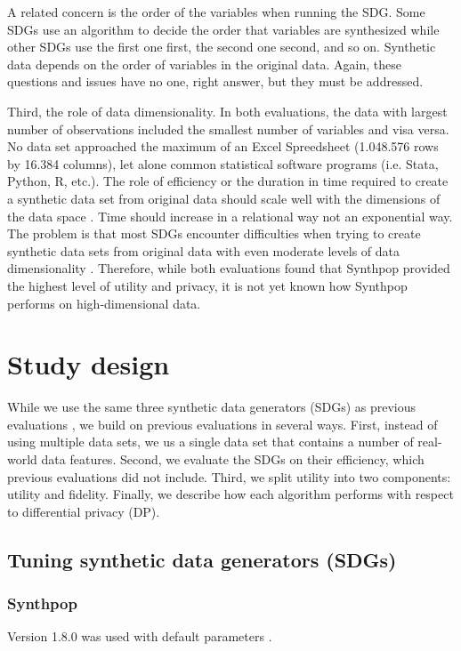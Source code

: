 \documentclass[runningheads]{llncs}
\begin{document}
A related concern is the order of the variables when running the SDG.  Some SDGs use an algorithm to decide the order that variables are synthesized while other SDGs use the first one first, the second one second, and so on.  Synthetic data depends on the order of variables in the original data.  Again, these questions and issues have no one, right answer, but they must be addressed.

Third, the role of data dimensionality.  In both evaluations, the data with largest number of observations included the smallest number of variables and visa versa.  No data set approached the maximum of an Excel Spreedsheet (1.048.576 rows by 16.384 columns), let alone common statistical software programs (i.e. Stata, Python, R, etc.).  The role of efficiency or the duration in time required to create a synthetic data set from original data should scale well with the dimensions of the data space \cite{jordon2022synthetic}.  Time should increase in a relational way not an exponential way.  The problem is that most SDGs encounter difficulties when trying to create synthetic data sets from original data with even moderate levels of data dimensionality \cite{zhang2017privbayes}.  Therefore, while both evaluations found that Synthpop provided the highest level of utility and privacy, it is not yet known how Synthpop performs on high-dimensional data.

\section{Study design}\label{sec:study_design}

While we use the same three synthetic data generators (SDGs) as previous evaluations \cite{dankar2021fake,little2022comparing}, we build on previous evaluations in several ways.  First, instead of using multiple data sets, we us a single data set that contains a number of real-world data features.  Second, we evaluate the SDGs on their efficiency, which previous evaluations did not include.  Third, we split utility into two components: utility and fidelity.  Finally, we describe how each algorithm performs with respect to differential privacy (DP).  

\subsection{Tuning synthetic data generators (SDGs)}

\subsubsection{Synthpop} Version 1.8.0 \cite{nowok2016synthpop} was used with default parameters . 
\end{document}

